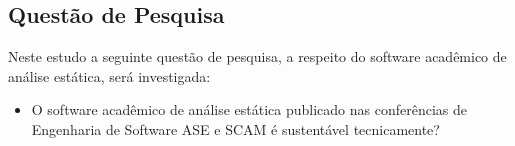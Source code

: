 \subsection{Questão de Pesquisa}

Neste estudo a seguinte questão de pesquisa, a respeito do software acadêmico
de análise estática, será investigada:


\begin{itemize}
  \item O software acadêmico de análise estática publicado nas conferências de
  Engenharia de Software ASE e SCAM é sustentável tecnicamente?
\end{itemize}



